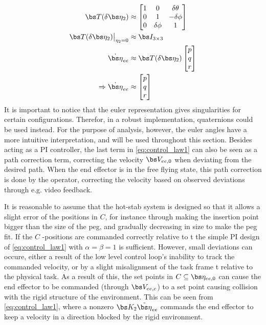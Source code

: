 \begin{align}
	\bs T(\delta \bs \eta_{2}) &\approx \begin{bmatrix} 1 & 0 & \delta \theta \\ 0 & 1 & -\delta \phi \\ 0 & \delta \phi & 1 \end{bmatrix}	
	\label{eq:linearized-transformation}
	\\
	\bs T(\delta \bs \eta_{2}) \big|_{\eta_{2}=0} &\approx \bs I_{3 \times 3}
	\label{eq:linearized-transformation2}
	\\
	\dot{\bs \eta}_{ee}&\approx\bs T(\delta \bs \eta_{2}) \begin{bmatrix} p \\ q \\ r\end{bmatrix}
	\\
	\Rightarrow \dot{\bs \eta}_{ee}&\approx \begin{bmatrix} p \\ q\\  r\end{bmatrix}
\end{align}
It is important to notice that the euler representation gives singularities for certain configurations. Therefor, in a robust implementation, quaternions could be used instead. For the purpose of analysis, however, the euler angles have a more intuitive interpretation, and will be used throughout this section.
Besides acting as a PI controller, the last term in \eqref{eq:control_law1} can also be seen as a path correction term, correcting the velocity $\bs V_{ee,0}$ when deviating from the desired path. When the end effector is in the free flying state, this path correction is done by the operator, correcting the velocity based on observed deviations through e.g. video feedback. 

It is reasonable to assume that the hot-stab system is designed so that it allows a slight error of the positions in $C$, for instance through making the insertion point bigger than the size of the peg, and gradually decreasing in size to make the peg fit. If the $C$ -positions are commanded correctly relative to \frame t the simple PI design of \ref{eq:control_law1} with $\alpha=\beta=1$ is sufficient. However, small deviations can occure, either a result of the low level control loop's inability to track the commanded velocity, or by a slight misalignment of the task frame \frame t relative to the physical task. As a result of this, the set points in $C \subseteq \bs \eta_{ee,0}$ can cause the end effector to be commanded (through $\bs V_{ee,c}$) to a set point causing collision with the rigid structure of the environment. This can be seen from \eqref{eq:control_law1}, where a nonzero $\bs K_{2}\tilde{\bs \eta}_{ee}$ commands the end effector to keep a velocity in a direction blocked by the rigid environment.

